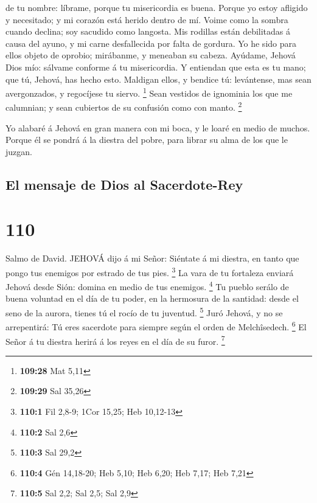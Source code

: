 de tu nombre: líbrame, porque tu misericordia es buena. 
Porque yo estoy afligido y necesitado; y mi corazón está herido dentro
de mí.  Voime como la sombra cuando declina; soy sacudido
como langosta.  Mis rodillas están debilitadas á causa del
ayuno, y mi carne desfallecida por falta de gordura.  Yo he
sido para ellos objeto de oprobio; mirábanme, y meneaban su cabeza.
 Ayúdame, Jehová Dios mío: sálvame conforme á tu
misericordia.  Y entiendan que esta es tu mano; que tú,
Jehová, has hecho esto.  Maldigan ellos, y bendice tú:
levántense, mas sean avergonzados, y regocíjese tu siervo. \footnote{\textbf{109:28}
  Mat 5,11}  Sean vestidos de ignominia los que me
calumnian; y sean cubiertos de su confusión como con manto. \footnote{\textbf{109:29}
  Sal 35,26}

 Yo alabaré á Jehová en gran manera con mi boca, y le loaré
en medio de muchos.  Porque él se pondrá á la diestra del
pobre, para librar su alma de los que le juzgan.

\hypertarget{el-mensaje-de-dios-al-sacerdote-rey}{%
\subsection{El mensaje de Dios al
Sacerdote-Rey}\label{el-mensaje-de-dios-al-sacerdote-rey}}

\hypertarget{section-109}{%
\section{110}\label{section-109}}

 Salmo de David. JEHOVÁ dijo á mi Señor: Siéntate á mi
diestra, en tanto que pongo tus enemigos por estrado de tus pies.
\footnote{\textbf{110:1} Fil 2,8-9; 1Cor 15,25; Heb 10,12-13}
 La vara de tu fortaleza enviará Jehová desde Sión: domina
en medio de tus enemigos. \footnote{\textbf{110:2} Sal 2,6} 
Tu pueblo serálo de buena voluntad en el día de tu poder, en la
hermosura de la santidad: desde el seno de la aurora, tienes tú el rocío
de tu juventud. \footnote{\textbf{110:3} Sal 29,2}  Juró
Jehová, y no se arrepentirá: Tú eres sacerdote para siempre según el
orden de Melchîsedech. \footnote{\textbf{110:4} Gén 14,18-20; Heb 5,10;
  Heb 6,20; Heb 7,17; Heb 7,21}  El Señor á tu diestra
herirá á los reyes en el día de su furor. \footnote{\textbf{110:5} Sal
  2,2; Sal 2,5; Sal 2,9}

